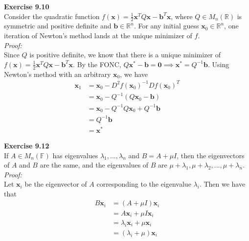 \documentclass[letterpaper,12pt]{article}
\let\vec\mathbf
\theoremstyle{definition}
\begin{document}
\textbf{Exercise 9.10} \\
Consider the quadratic function $f(\vec{x})=\frac{1}{2}\vec{x}^TQ\vec{x} - \vec{b}^T\vec{x}$, where $Q \in M_n(\mathbb{R})$ is symmetric and positive definite and $\vec{b} \in \mathbb{R}^n$. For any initial guess $\vec{x}_0 \in \mathbb{R}^n$, one iteration of Newton's method lands at the unique minimizer of $f$. \\
\textit{Proof:} \\
Since $Q$ is positive definite, we know that there is a unique minimizer of $f(\vec{x})=\frac{1}{2}\vec{x}^TQ\vec{x} - \vec{b}^T\vec{x}$. By the FONC, $Q\vec{x}^* - \vec{b} = \vec{0} \implies \vec{x}^* = Q^{-1}\vec{b}$. Using Newton's method with an arbitrary $\vec{x}_0$, we have
\begin{align*}
  \vec{x}_1 &= \vec{x}_0 - D^2f(\vec{x}_0)^{-1}Df(\vec{x}_0)^T
  \\
  &= \vec{x}_0 - Q^{-1}(Q\vec{x}_0 - \vec{b})
  \\
  &= \vec{x}_0 - Q^{-1}Q\vec{x}_0 + Q^{-1}\vec{b}
  \\
  &= Q^{-1}\vec{b}
  \\
  &= \vec{x}^*
\end{align*}

\textbf{Exercise 9.12} \\
If $A \in M_n(\mathbb{F})$ has eigenvalues $\lambda_1, ..., \lambda_n$ and $B = A + \mu I$, then the eigenvectors of $A$ and $B$ are the same, and the eigenvalues of $B$ are $\mu + \lambda_1, \mu + \lambda_2, ..., \mu + \lambda_n$. \\
\textit{Proof:} \\
Let $\vec{x}_i$ be the eigenvector of $A$ corresponding to the eigenvalue $\lambda_i$. Then we have that
\begin{align*}
  B\vec{x}_i &= (A+\mu I)\vec{x}_i \\
  &= A\vec{x}_i + \mu I\vec{x}_i \\
  &= \lambda_i\vec{x}_i + \mu\vec{x}_i \\
  &= (\lambda_i + \mu)\vec{x}_i
\end{align*}
\end{document}
